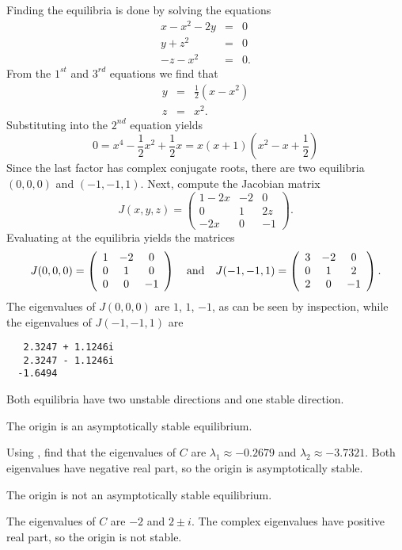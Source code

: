 \soln  Finding the equilibria is done by solving the equations
\begin{eqnarray*}
x - x^2 - 2y & = & 0 \\
y + z^2 & = & 0 \\
-z - x^2 & = & 0.
\end{eqnarray*}
From the $1^{st}$ and $3^{rd}$ equations we find that
\begin{eqnarray*}
 y & = & \frac{1}{2}(x-x^2)\\
 z & = & x^2.
\end{eqnarray*}
Substituting into the $2^{nd}$ equation yields
\[
 0 = x^4 - \frac{1}{2}x^2 + \frac{1}{2}x = x(x+1)(x^2-x+\frac{1}{2})
\]
Since the last factor has complex conjugate roots, there are two equilibria
$(0,0,0)$ and $(-1,-1,1)$.  Next, compute the Jacobian matrix
\[
J(x,y,z) = \left(\begin{array}{ccc}
1-2x & -2 & 0\\ 0 & 1 & 2z\\ -2x & 0 & -1 \end{array}\right).
\]
Evaluating at the equilibria yields the matrices
\[
J(0,0,0) = \left(\begin{array}{ccc}
1 & -2 & 0\\ 0 & 1 & 0\\ 0 & 0 & -1 \end{array}\right)
\quad\mbox{and}\quad 
J(-1,-1,1) = \left(\begin{array}{ccc}
3 & -2 & 0\\ 0 & 1 & 2\\ 2 & 0 & -1 \end{array}\right).
\]
The eigenvalues of $J(0,0,0)$ are $1$, $1$, $-1$, as can be seen by
inspection, while the eigenvalues of $J(-1,-1,1)$ are
\begin{verbatim}
   2.3247 + 1.1246i
   2.3247 - 1.1246i
  -1.6494     
\end{verbatim}
Both equilibria have two unstable directions and one stable direction.




\ans The origin is an asymptotically stable equilibrium.

\soln Using \Matlabp, find that the eigenvalues of $C$ are $\lambda_1
\approx -0.2679$ and $\lambda_2 \approx -3.7321$.  Both eigenvalues
have negative real part, so the origin is asymptotically stable.

\ans The origin is not an asymptotically stable equilibrium.

\soln The eigenvalues of $C$ are $-2$ and $2 \pm i$.  The complex
eigenvalues have positive real part, so the origin is not stable.


